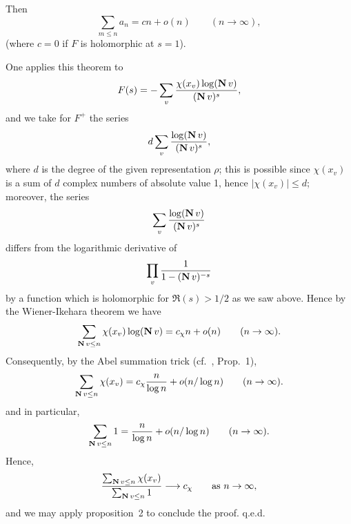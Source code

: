 \begin{subappendices}
\begin{thm}
	Then
	\[
		\sum_{m\le n} a_n = cn + o(n) \qquad (n \to \infty),
	\]
	(where $c = 0$ if $F$ is holomorphic at $s = 1$).
\end{thm}
One applies this theorem to
\[
	F(s) = -\sum_{v} \frac{\chi(x_v) \log(\operatorname{\mathbf{N}} v)}{(\operatorname{\mathbf{N}} v)^s},
\]
and we take for $F^+$ the series
\[
	d \sum_{v} \frac{\log(\operatorname{\mathbf{N}} v)}{(\operatorname{\mathbf{N}} v)^s},
\]
where $d$ is the degree of the given representation $\rho$; this is possible
\dpage
since $\chi(x_v)$ is a sum of $d$ complex numbers of absolute value 1,
hence $|\chi(x_v)| \le d$; moreover, the series
\[
	\sum_{v} \frac{\log(\operatorname{\mathbf{N}} v)}{(\operatorname{\mathbf{N}} v)^s}
\]
differs from the logarithmic derivative of
\[
	\prod_{v} \frac{1}{1 - (\operatorname{\mathbf{N}} v)^{-s}}
\]
by a function which is holomorphic for $\Re(s) > 1/2$ as we saw above.
Hence by the Wiener-Ikehara theorem we have
\[
	\sum_{\operatorname{\mathbf{N}} v \le n} \chi(x_v) \log(\operatorname{\mathbf{N}} v) = c_\chi n + o(n)
	\qquad (n \to \infty).
\]
Consequently, by the Abel summation trick (cf.\ \cite[124]{13}, Prop.~1),
\[
	\sum_{\operatorname{\mathbf{N}} v \le n} \chi(x_v) = c_\chi \frac{n}{\log n} + o(n/\log
	n) \qquad (n \to \infty).
\]
and in particular,
\[
	\sum_{\operatorname{\mathbf{N}} v \le n} 1 = \frac{n}{\log n} + o(n/\log n) \qquad (n
	\to \infty).
\]
Hence,
\[
	\frac{ \sum_{\operatorname{\mathbf{N}} v \le n} \chi(x_v) }{ \sum_{\operatorname{\mathbf{N}} v \le n} 1 }
	\longrightarrow c_\chi \qquad \text{as } n\to \infty,
\]
and we may apply proposition~2 to conclude the proof.
\hfill
q.e.d.

\end{subappendices}
